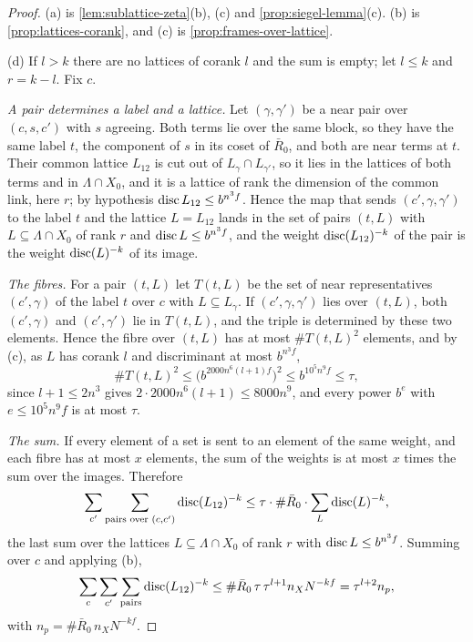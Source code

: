 \begin{proof}
(a) is \cref{lem:sublattice-zeta}(b), (c) and \cref{prop:siegel-lemma}(c). (b) is \cref{prop:lattices-corank}, and (c) is \cref{prop:frames-over-lattice}.

(d) If $l>k$ there are no lattices of corank $l$ and the sum is empty; let $l\le k$ and $r=k-l$. Fix $c$.

\emph{A pair determines a label and a lattice.} Let $(\gamma,\gamma')$ be a near pair over $(c,s,c')$ with $s$ agreeing. Both terms lie over the same block, so they have the same label $t$, the component of $s$ in its coset of $\bar R_0$, and both are near terms at $t$.
Their common lattice $L_{12}$ is cut out of $L_\gamma\cap L_{\gamma'}$, so it lies in the lattices of both terms and in $\Lambda\cap X_0$, and it is a lattice of rank the dimension of the common link, here $r$; by hypothesis $\operatorname{disc} L_{12}\le b^{n^3f}$.
Hence the map that sends $(c',\gamma,\gamma')$ to the label $t$ and the lattice $L=L_{12}$ lands in the set of pairs $(t,L)$ with $L\subseteq\Lambda\cap X_0$ of rank $r$ and $\operatorname{disc} L\le b^{n^3f}$, and the weight $\operatorname{disc}(L_{12})^{-k}$ of the pair is the weight $\operatorname{disc}(L)^{-k}$ of its image.

\emph{The fibres.} For a pair $(t,L)$ let $T(t,L)$ be the set of near representatives $(c',\gamma)$ of the label $t$ over $c$ with $L\subseteq L_\gamma$. If $(c',\gamma,\gamma')$ lies over $(t,L)$, both $(c',\gamma)$ and $(c',\gamma')$ lie in $T(t,L)$, and the triple is determined by these two
elements. Hence the fibre over $(t,L)$ has at most $\#T(t,L)^2$ elements, and by (c), as $L$ has corank $l$ and discriminant at most $b^{n^3f}$,
\[
  \#T(t,L)^2\le\bigl(b^{2000n^6(l+1)f}\bigr)^2\le b^{10^5n^9f}\le\tau,
\]
since $l+1\le2n^3$ gives $2\cdot2000n^6(l+1)\le8000n^9$, and every power $b^e$ with $e\le10^5n^9f$ is at most $\tau$.

\emph{The sum.} If every element of a set is sent to an element of the same weight, and each fibre has at most $x$ elements, the sum of the weights is at most $x$ times the sum over the images. Therefore
\[
  \sum_{c'}\sum_{\text{pairs over }(c,c')}\operatorname{disc}(L_{12})^{-k}\le\tau\cdot\#\bar R_0\cdot\sum_L\operatorname{disc}(L)^{-k},
\]
the last sum over the lattices $L\subseteq\Lambda\cap X_0$ of rank $r$ with $\operatorname{disc} L\le b^{n^3f}$. Summing over $c$ and applying (b),
\[
  \sum_c\sum_{c'}\sum_{\text{pairs}}\operatorname{disc}(L_{12})^{-k}\le\#\bar R_0\,\tau\,\tau^{l+1}n_XN^{-kf}=\tau^{l+2}n_p,
\]
with $n_p=\#\bar R_0\,n_XN^{-kf}$.
\end{proof}

